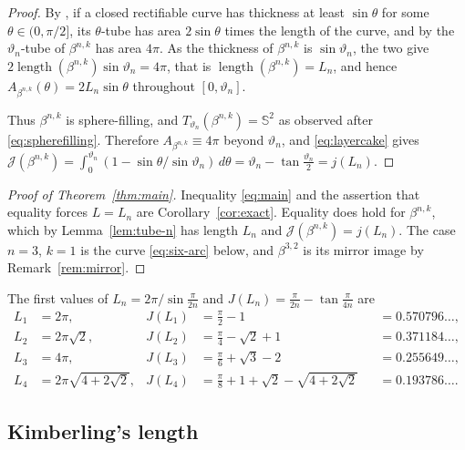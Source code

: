 \documentclass[11pt,oneside,reqno]{amsart}
\theoremstyle{plain}
\theoremstyle{definition}
\DeclareMathOperator{\length}{length}
\newcommand{\Sph}{\mathbb{S}^{2}}
\newcommand{\bta}[2]{\beta^{#1,#2}}
\begin{document}
\begin{proof}
By \cite[Prop.~1]{GvdM2011b}, if a closed rectifiable curve has thickness at
least $\sin\theta$ for some $\theta\in(0,\pi/2]$, its $\theta$-tube has area
$2\sin\theta$ times the length of the curve, and by \cite[(2.4)]{GvdM2011b} the
$\vartheta_{n}$-tube of $\bta{n}{k}$ has area $4\pi$. As the thickness of
$\bta{n}{k}$ is $\sin\vartheta_{n}$, the two give
$2\length(\bta{n}{k})\sin\vartheta_{n}=4\pi$, that is
$\length(\bta{n}{k})=L_{n}$, and hence $A_{\bta{n}{k}}(\theta)=2L_{n}\sin\theta$
throughout $[0,\vartheta_{n}]$.

Thus $\bta{n}{k}$ is sphere-filling, and $T_{\vartheta_{n}}(\bta{n}{k})=\Sph$ as
observed after \eqref{eq:spherefilling}. Therefore $A_{\bta{n}{k}}\equiv4\pi$ beyond
$\vartheta_{n}$, and \eqref{eq:layercake} gives
$\mathcal{J}(\bta{n}{k})=\int_{0}^{\vartheta_{n}}
 (1-\sin\theta/\sin\vartheta_{n})\,d\theta
=\vartheta_{n}-\tan\frac{\vartheta_{n}}{2}=j(L_{n})$.
\end{proof}

\begin{proof}[Proof of Theorem~\ref{thm:main}]
Inequality \eqref{eq:main} and the assertion that equality forces $L=L_{n}$ are
Corollary~\ref{cor:exact}. Equality does hold for
$\bta{n}{k}$, which by Lemma~\ref{lem:tube-n} has length $L_{n}$ and
$\mathcal{J}(\bta{n}{k})=j(L_{n})$. The case $n=3$, $k=1$ is
the curve \eqref{eq:six-arc} below, and $\bta{3}{2}$ is its mirror image by
Remark~\ref{rem:mirror}.
\end{proof}

The first values of $L_{n}=2\pi/\sin\frac{\pi}{2n}$ and
$J(L_{n})=\frac{\pi}{2n}-\tan\frac{\pi}{4n}$ are
{\tiny
\begin{equation}
\begin{aligned}
  L_{1}&=2\pi, & J(L_{1})&=\tfrac{\pi}{2}-1&&=0.570796\ldots, \\
  L_{2}&=2\pi\sqrt{2}, & J(L_{2})&=\tfrac{\pi}{4}-\sqrt{2}+1&&=0.371184\ldots, \\
  L_{3}&=4\pi, & J(L_{3})&=\tfrac{\pi}{6}+\sqrt{3}-2&&=0.255649\ldots, \\
  L_{4}&=2\pi\sqrt{4+2\sqrt{2}}, &
       J(L_{4})&=\tfrac{\pi}{8}+1+\sqrt{2}-\sqrt{4+2\sqrt{2}}&&=0.193786\ldots.
\end{aligned}
\end{equation}
}
\subsection{Kimberling's length}
\end{document}
